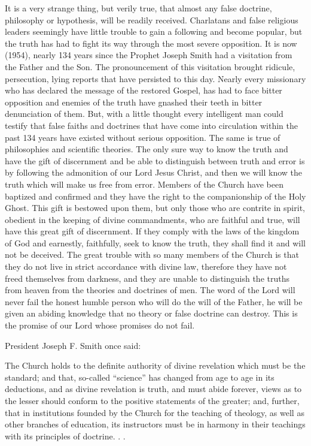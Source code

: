 It is a very strange thing, but verily true, that almost any false doctrine, philosophy or
hypothesis, will be readily received. Charlatans and false religious leaders seemingly have
little trouble to gain a following and become popular, but the truth has had to fight its way
through the most severe opposition. It is now (1954), nearly 134 years since the Prophet
Joseph Smith had a visitation from the Father and the Son. The pronouncement of this
visitation brought ridicule, persecution, lying reports that have persisted to this day. Nearly
every missionary who has declared the message of the restored Gospel, has had to face bitter
opposition and enemies of the truth have gnashed their teeth in bitter denunciation of them.
But, with a little thought every intelligent man could testify that false faiths and doctrines that
have come into circulation within the past 134 years have existed without serious opposition.
The same is true of philosophies and scientific theories. The only sure way to know the truth
and have the gift of discernment and be able to distinguish between truth and error is by
following the admonition of our Lord Jesus Christ, and then we will know the truth which
will make us free from error. Members of the Church have been baptized and confirmed and
they have the right to the companionship of the Holy Ghost. This gift is bestowed upon them,
but only those who are contrite in spirit, obedient in the keeping of divine commandments,
who are faithful and true, will have this great gift of discernment. If they comply with the
laws of the kingdom of God and earnestly, faithfully, seek to know the truth, they shall find it
and will not be deceived. The great trouble with so many members of the Church is that they
do not live in strict accordance with divine law, therefore they have not freed themselves
from darkness, and they are unable to distinguish the truths from heaven from the theories
and doctrines of men. The word of the Lord will never fail the honest humble person who
will do the will of the Father, he will be given an abiding knowledge that no theory or false
doctrine can destroy. This is the promise of our Lord whose promises do not fail.

President Joseph F. Smith once said:

The Church holds to the definite authority of divine revelation which must be the standard;
and that, so-called ``science'' has changed from age to age in its deductions, and as divine
revelation is truth, and must abide forever, views as to the lesser should conform to the
positive statements of the greater; and, further, that in institutions founded by the Church for
the teaching of theology, as well as other branches of education, its instructors must be in
harmony in their teachings with its principles of doctrine. . .

